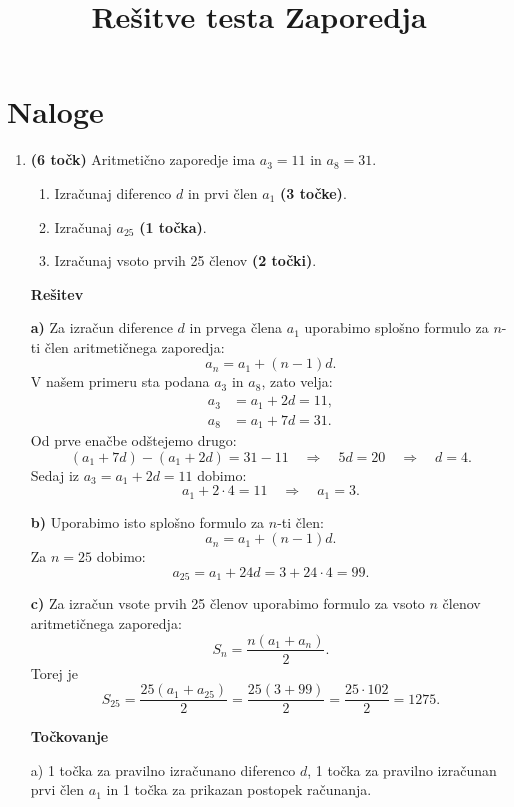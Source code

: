 \documentclass[a4paper,12pt]{article}
\begin{document}
\title{Rešitve testa Zaporedja}
\author{}
\date{}
\maketitle

\section*{Naloge}

\begin{enumerate}
\item \textbf{(6 točk)} Aritmetično zaporedje ima $a_3=11$ in $a_8=31$.
\begin{enumerate}[label=\alph*)]
  \item Izračunaj diferenco $d$ in prvi člen $a_1$ \textbf{(3 točke)}.
  \item Izračunaj $a_{25}$ \textbf{(1 točka)}.
  \item Izračunaj vsoto prvih 25 členov \textbf{(2 točki)}.
\end{enumerate}

\vspace{0.5em}

\textbf{\large Rešitev}

\textbf{a)}
Za izračun diference $d$ in prvega člena $a_1$ uporabimo splošno formulo za $n$-ti člen aritmetičnega zaporedja:
\[
 a_n=a_1+(n-1)d.
\]
V našem primeru sta podana $a_3$ in $a_8$, zato velja:
\begin{align*}
 a_3 &= a_1 + 2d = 11, \\
 a_8 &= a_1 + 7d = 31.
\end{align*}
Od prve enačbe odštejemo drugo:
\[
(a_1+7d)-(a_1+2d)=31-11
\quad\Rightarrow\quad
5d=20
\quad\Rightarrow\quad
d=4.
\]
Sedaj iz $a_3=a_1+2d=11$ dobimo:
\[
 a_1 + 2\cdot 4 = 11
\quad\Rightarrow\quad
 a_1 = 3.
\]

\textbf{b)}
Uporabimo isto splošno formulo za $n$-ti člen:
\[
 a_n=a_1+(n-1)d.
\]
Za $n=25$ dobimo:
\[
 a_{25}=a_1+24d=3+24\cdot 4=99.
\]

\textbf{c)}
Za izračun vsote prvih 25 členov uporabimo formulo za vsoto $n$ členov aritmetičnega zaporedja:
\[
 S_n=\frac{n(a_1+a_n)}{2}.
\]
Torej je
\[
 S_{25}=\dfrac{25(a_1+a_{25})}{2}=\dfrac{25(3+99)}{2}=\dfrac{25\cdot 102}{2}=1275.
\]

\vspace{0.5em}
\textbf{\large Točkovanje}

 a) 1 točka za pravilno izračunano diferenco $d$, 1 točka za pravilno izračunan prvi člen $a_1$ in 1 točka za prikazan postopek računanja.


\end{enumerate}
\end{document}

